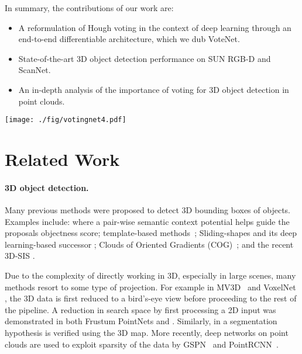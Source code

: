 \documentclass[10pt,twocolumn,letterpaper]{article}
\newcommand\votenet{VoteNet}
\begin{document}
In summary, the contributions of our work are:
\begin{itemize}
    \setlength\itemsep{0.1em}
    \item A reformulation of Hough voting in the context of deep learning through an end-to-end differentiable architecture, which we dub \votenet{}.
    \item State-of-the-art 3D object detection performance on SUN RGB-D and ScanNet.
    \item An in-depth analysis of the importance of voting for 3D object detection in point clouds.
\end{itemize}



\begin{figure*}[t!]
    \centering
    \texttt{[image: ./fig/votingnet4.pdf]}
    \caption{\textbf{Illustration of the \votenet~architecture} for 3D object detection in point clouds. Given an input point cloud of  points with XYZ coordinates, a backbone network (implemented with PointNet++~\cite{qi2017pointnetplusplus} layers) subsamples and learns deep features on the points and outputs a subset of  points but extended by -dim features. This subset of points are considered as seed points. Each seed independently generates a vote through a voting module. Then the votes are grouped into clusters and processed by the proposal module to generate the final proposals. The classified and NMSed proposals become the final 3D bounding boxes output. Image best viewed in color.}
    \label{fig:votingnet}
\end{figure*}
 
\section{Related Work}
\paragraph{3D object detection.}
Many previous methods were proposed to detect 3D bounding boxes of objects.
Examples include: \cite{lin2013holistic} where a pair-wise semantic context potential helps guide the proposals objectness score;  template-based methods~\cite{li2015database, Indoor2012, litany2015asist}; Sliding-shapes \cite{song2014sliding} and its deep learning-based successor \cite{song2016deep}; Clouds of Oriented Gradients (COG)~\cite{ren2016three}; and the recent 3D-SIS \cite{hou20183d}.


Due to the complexity of directly working in 3D, especially in large scenes, many methods resort to some type of projection.   For example in MV3D~\cite{cvpr17chen} and VoxelNet \cite{zhou2018voxelnet}, the 3D data is first reduced to a bird's-eye view before proceeding to the rest of the pipeline. A reduction in search space by first processing a 2D input was demonstrated in both Frustum PointNets \cite{qi2018frustum} and \cite{lahoud20172d}. Similarly, in \cite{kim2013accurate} a segmentation hypothesis is verified using the 3D map. 
More recently, deep networks on point clouds are used to exploit sparsity of the data by GSPN~\cite{yi2018gspn} and PointRCNN~\cite{shi2018pointrcnn}.
\end{document}
